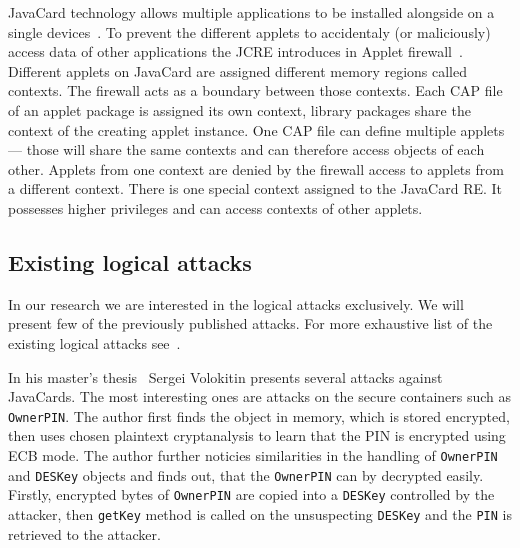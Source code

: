 \documentclass{../llncs/llncs}
\begin{document}
    JavaCard technology allows multiple applications to be installed alongside on a single devices~\cite{jcspecs31download}. To prevent the different applets to accidentaly (or maliciously) access data of other applications the JCRE introduces in Applet firewall~\cite{jcspecs31download}. Different applets on JavaCard are assigned different memory regions called contexts. The firewall acts as a boundary between those contexts. Each CAP file of an applet package is assigned its own context, library packages share the context of the creating applet instance. One CAP file can define multiple applets --- those will share the same contexts and can therefore access objects of each other. Applets from one context are denied by the firewall access to applets from a different context.
    There is one special context assigned to the JavaCard RE. It possesses higher privileges and can access contexts of other applets.


    \subsection{Existing logical attacks}
    In our research we are interested in the logical attacks exclusively. We will present few of the previously published attacks. For more exhaustive list of the existing logical attacks see~\cite{anon2020thesis,sergei,se:oracle:part1,se:oracle:part2,se:oracle:part3}.

    In his master's thesis~\cite{sergei} Sergei Volokitin presents several attacks against JavaCards.
    The most interesting ones are attacks on the secure containers such as \texttt{OwnerPIN}. The author first finds the object in memory, which is stored encrypted, then uses chosen plaintext cryptanalysis to learn that the PIN is encrypted using ECB mode. The author further noticies similarities in the handling of \texttt{OwnerPIN} and \texttt{DESKey} objects and finds out, that the \texttt{OwnerPIN} can by decrypted easily. Firstly, encrypted bytes of \texttt{OwnerPIN} are copied into a \texttt{DESKey} controlled by the attacker, then \texttt{getKey} method is called on the unsuspecting \texttt{DESKey} and the \texttt{PIN} is retrieved to the attacker.
\end{document}
